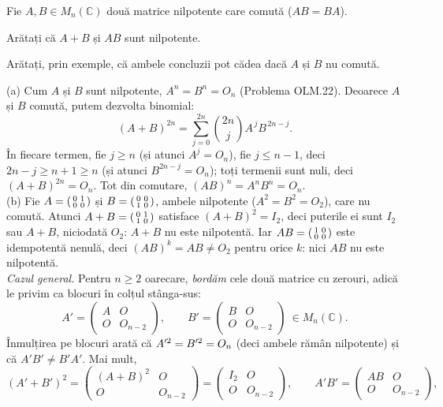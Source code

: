 Fie $A,B\in M_n(\mathbb{C})$ două matrice nilpotente care comută ($AB=BA$).
\begin{parti}
  \item Arătați că $A+B$ și $AB$ sunt nilpotente.
  \item Arătați, prin exemple, că ambele concluzii pot cădea dacă $A$ și $B$ nu comută.
\end{parti}
\sol (a) Cum $A$ și $B$ sunt nilpotente, $A^n=B^n=O_n$ (Problema OLM.22). Deoarece $A$ și $B$ comută, putem dezvolta binomial:
\[ (A+B)^{2n}=\sum_{j=0}^{2n}\binom{2n}{j}A^{\,j}B^{\,2n-j}. \]
În fiecare termen, fie $j\ge n$ (și atunci $A^j=O_n$), fie $j\le n-1$, deci $2n-j\ge n+1\ge n$ (și atunci $B^{2n-j}=O_n$); toți termenii sunt nuli, deci $(A+B)^{2n}=O_n$. Tot din comutare, $(AB)^n=A^nB^n=O_n$.\\[2pt]
(b) Fie $A=\begin{psmallmatrix}0&1\\0&0\end{psmallmatrix}$ și $B=\begin{psmallmatrix}0&0\\1&0\end{psmallmatrix}$, ambele nilpotente ($A^2=B^2=O_2$), care nu comută. Atunci $A+B=\begin{psmallmatrix}0&1\\1&0\end{psmallmatrix}$ satisface $(A+B)^2=I_2$, deci puterile ei sunt $I_2$ sau $A+B$, niciodată $O_2$: $A+B$ nu este nilpotentă. Iar $AB=\begin{psmallmatrix}1&0\\0&0\end{psmallmatrix}$ este idempotentă nenulă, deci $(AB)^k=AB\neq O_2$ pentru orice $k$: nici $AB$ nu este nilpotentă.\\[2pt]
\emph{Cazul general.} Pentru $n\ge2$ oarecare, \emph{bordăm} cele două matrice cu zerouri, adică le privim ca blocuri în colțul stânga-sus:
\[ A'=\begin{pmatrix} A & O\\ O & O_{n-2}\end{pmatrix},\qquad B'=\begin{pmatrix} B & O\\ O & O_{n-2}\end{pmatrix}\ \in M_n(\mathbb{C}). \]
Înmulțirea pe blocuri arată că $A'^2=B'^2=O_n$ (deci ambele rămân nilpotente) și că $A'B'\neq B'A'$. Mai mult,
\[ (A'+B')^2=\begin{pmatrix}(A+B)^2 & O\\ O & O_{n-2}\end{pmatrix}=\begin{pmatrix}I_2 & O\\ O & O_{n-2}\end{pmatrix},\qquad A'B'=\begin{pmatrix}AB & O\\ O& O_{n-2}\end{pmatrix}, \]
